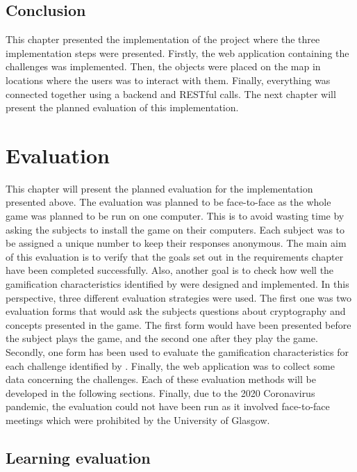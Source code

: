 \documentclass{l4proj}
\begin{document}
\section{Conclusion}

This chapter presented the implementation of the project where the three implementation steps were presented. 
Firstly, the web application containing the challenges was implemented.
Then, the objects were placed on the map in locations where the users was to interact with them.
Finally, everything was connected together using a backend and RESTful calls.
The next chapter will present the planned evaluation of this implementation.

\chapter{Evaluation} 

This chapter will present the planned evaluation for the implementation presented above.
The evaluation was planned to be face-to-face as the whole game was planned to be run on one computer.
This is to avoid wasting time by asking the subjects to install the game on their computers.
Each subject was to be assigned a unique number to keep their responses anonymous.
The main aim of this evaluation is to verify that the goals set out in the requirements chapter have been completed successfully.
Also, another goal is to check how well the gamification characteristics identified by \citet{cugelman_gamification:_2013} were designed 
and implemented.
In this perspective, three different evaluation strategies were used.
The first one was two evaluation forms that would ask the subjects questions about cryptography and concepts presented in the game.
The first form would have been presented before the subject plays the game, and the second one after they play the game.
Secondly, one form has been used to evaluate the gamification characteristics for each challenge identified by \citet{cugelman_gamification:_2013}.
Finally, the web application was to collect some data concerning the challenges.
Each of these evaluation methods will be developed in the following sections.
Finally, due to the 2020 Coronavirus pandemic, the evaluation could not have been run as it involved face-to-face meetings which 
were prohibited by the University of Glasgow.

\section{Learning evaluation}
\end{document}
